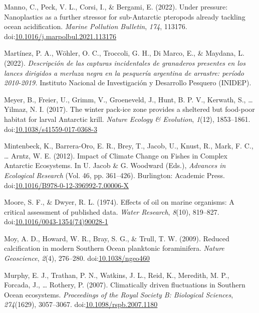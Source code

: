\documentclass[
]{article}
\newlength{\cslhangindent}
\newenvironment{CSLReferences}[2] %
 {\begin{list}{}{%
  \setlength{\itemindent}{0pt}
  \setlength{\leftmargin}{0pt}
  \setlength{\parsep}{0pt}
  \ifodd #1
   \setlength{\leftmargin}{\cslhangindent}
   \setlength{\itemindent}{-1\cslhangindent}
  \fi
  \setlength{\itemsep}{#2\baselineskip}}}
 {\end{list}}
\begin{document}
\begin{CSLReferences}{1}{0}
Manno, C., Peck, V. L., Corsi, I., \& Bergami, E. (2022). Under
pressure: {Nanoplastics} as a further stressor for sub-{Antarctic}
pteropods already tackling ocean acidification. \emph{Marine Pollution
Bulletin}, \emph{174}, 113176.
doi:\href{https://doi.org/10.1016/j.marpolbul.2021.113176}{10.1016/j.marpolbul.2021.113176}

Martínez, P. A., Wöhler, O. C., Troccoli, G. H., Di Marco, E., \&
Maydana, L. (2022). \emph{{Descripción de las capturas incidentales de
granaderos presentes en los lances dirigidos a merluza negra en la
pesquería argentina de arrastre: período 2010-2019.}} {Instituto
Nacional de Investigación y Desarrollo Pesquero (INIDEP)}.

Meyer, B., Freier, U., Grimm, V., Groeneveld, J., Hunt, B. P. V.,
Kerwath, S., \ldots{} Yilmaz, N. I. (2017). The winter pack-ice zone
provides a sheltered but food-poor habitat for larval {Antarctic} krill.
\emph{Nature Ecology \& Evolution}, \emph{1}(12), 1853--1861.
doi:\href{https://doi.org/10.1038/s41559-017-0368-3}{10.1038/s41559-017-0368-3}

Mintenbeck, K., Barrera-Oro, E. R., Brey, T., Jacob, U., Knust, R.,
Mark, F. C., \ldots{} Arntz, W. E. (2012). Impact of {Climate Change} on
{Fishes} in {Complex Antarctic Ecosystems}. In U. Jacob \& G. Woodward
(Eds.), \emph{Advances in {Ecological Research}} (Vol. 46, pp.
361--426). {Burlington}: {Academic Press}.
doi:\href{https://doi.org/10.1016/B978-0-12-396992-7.00006-X}{10.1016/B978-0-12-396992-7.00006-X}

Moore, S. F., \& Dwyer, R. L. (1974). Effects of oil on marine
organisms: {A} critical assessment of published data. \emph{Water
Research}, \emph{8}(10), 819--827.
doi:\href{https://doi.org/10.1016/0043-1354(74)90028-1}{10.1016/0043-1354(74)90028-1}

Moy, A. D., Howard, W. R., Bray, S. G., \& Trull, T. W. (2009). Reduced
calcification in modern {Southern Ocean} planktonic foraminifera.
\emph{Nature Geoscience}, \emph{2}(4), 276--280.
doi:\href{https://doi.org/10.1038/ngeo460}{10.1038/ngeo460}

Murphy, E. J., Trathan, P. N., Watkins, J. L., Reid, K., Meredith, M.
P., Forcada, J., \ldots{} Rothery, P. (2007). Climatically driven
fluctuations in {Southern Ocean} ecosystems. \emph{Proceedings of the
Royal Society B: Biological Sciences}, \emph{274}(1629), 3057--3067.
doi:\href{https://doi.org/10.1098/rspb.2007.1180}{10.1098/rspb.2007.1180}


\end{CSLReferences}
\end{document}
